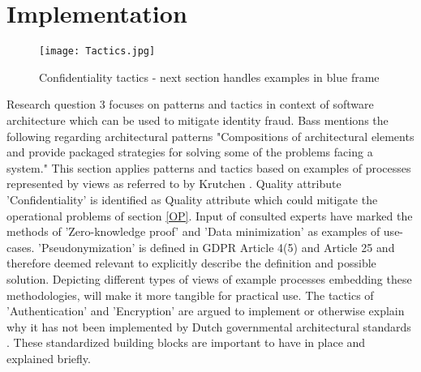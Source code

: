 \chapter{Implementation}\label{s:Implementation}

\graphicspath{ {./images/} }
    \begin{figure}
        \centering
        \texttt{[image: Tactics.jpg]}\\
        \caption{Confidentiality tactics - next section handles examples in blue frame}
        \label{fig:Tactics}
    \end{figure}

Research question 3 focuses on patterns and tactics in context of software architecture which can be used to mitigate identity fraud. Bass \etal \cite{Bass2015SoftwareAI} mentions the following regarding architectural patterns "Compositions of architectural elements and provide packaged strategies for solving some of the problems facing a system." This section applies patterns and tactics based on examples of processes represented by views as referred to by Krutchen \cite{Krutchen1995ArchitecturalB}. Quality attribute 'Confidentiality' is identified as Quality attribute which could mitigate the operational problems of section \ref{OP}. Input of consulted experts have marked the methods of 'Zero-knowledge proof' and 'Data minimization' as examples of use-cases. 'Pseudonymization' is defined in GDPR Article 4(5) and Article 25 \cite{GDPR} and therefore deemed relevant to explicitly describe the definition and possible solution. Depicting different types of views of example processes embedding these methodologies, will make it more tangible for practical use. The tactics of 'Authentication' and 'Encryption' are argued to implement or otherwise explain why it has not been implemented by Dutch governmental architectural standards \cite{NORA_PasToeOfLegUit}. These standardized building blocks are important to have in place and explained briefly. 

